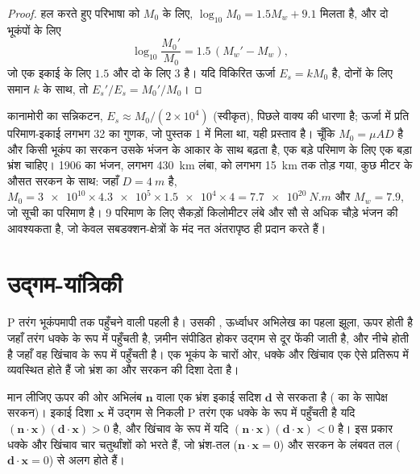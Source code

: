 \begin{proof}
हल करते हुए परिभाषा को $M_0$ के लिए, $\log_{10} M_0 = 1.5 M_w + 9.1$ मिलता है, और दो भूकंपों के लिए
\[
  \log_{10}\frac{M_0'}{M_0} = 1.5\,(M_w' - M_w) ,
\]
जो एक इकाई के लिए $1.5$ और दो के लिए $3$ है। यदि विकिरित ऊर्जा $E_s = k M_0$ है, दोनों के लिए समान $k$ के साथ, तो $E_s'/E_s = M_0'/M_0$।
\end{proof}

कानामोरी का सन्निकटन, $E_s \approx M_0/(2\times10^4)$ (स्वीकृत), पिछले वाक्य की धारणा है; ऊर्जा में प्रति परिमाण-इकाई लगभग 32 का गुणक, जो पुस्तक 1 में मिला था, यही प्रस्ताव है। चूँकि $M_0 = \mu A D$ है और किसी भूकंप का सरकन उसके भंजन के आकार के साथ बढ़ता है, एक बड़े परिमाण के लिए एक बड़ा भ्रंश चाहिए। 1906 का भंजन, लगभग \qty{430}{km} लंबा,  को लगभग \qty{15}{km} तक तोड़ गया, कुछ मीटर के औसत सरकन के साथ: जहाँ $D = \qty{4}{m}$ है, $M_0 = \num{3e10}\times\num{4.3e5}\times\num{1.5e4}
\times 4 = \qty{7.7e20}{N.m}$ और $M_w = 7.9$, जो सूची का परिमाण है। 9 परिमाण के लिए सैकड़ों किलोमीटर लंबे और सौ से अधिक चौड़े भंजन की आवश्यकता है, जो केवल सबडक्शन-क्षेत्रों के मंद नत अंतरापृष्ठ ही प्रदान करते हैं।

\section{उद्गम-यांत्रिकी}\label{sec:b1:earthquake-source:focal}

P तरंग भूकंपमापी तक पहुँचने वाली पहली है। उसकी , ऊर्ध्वाधर अभिलेख का पहला झूला, ऊपर होती है जहाँ तरंग धक्के के रूप में पहुँचती है, ज़मीन संपीडित होकर उद्गम से दूर फेंकी जाती है, और नीचे होती है जहाँ वह खिंचाव के रूप में पहुँचती है। एक भूकंप के चारों ओर, धक्के और खिंचाव एक ऐसे प्रतिरूप में व्यवस्थित होते हैं जो भ्रंश का  और सरकन की दिशा देता है।

\begin{proposition}[प्रथम गति का चिह्न]
\label{prop:b1:earthquake-source:first-motion}
मान लीजिए ऊपर की ओर अभिलंब $\mathbf n$ वाला एक भ्रंश इकाई सदिश $\mathbf d$ से सरकता है ( का  के सापेक्ष सरकन)। इकाई दिशा $\mathbf x$ में उद्गम से निकली P तरंग एक धक्के के रूप में पहुँचती है यदि $(\mathbf n\cdot\mathbf x)(\mathbf d\cdot\mathbf x) > 0$ है, और खिंचाव के रूप में यदि $(\mathbf n\cdot\mathbf x)(\mathbf d\cdot\mathbf x) < 0$ है। इस प्रकार धक्के और खिंचाव चार चतुर्थांशों को भरते हैं, जो भ्रंश-तल ($\mathbf n\cdot\mathbf x = 0$) और सरकन के लंबवत तल ($\mathbf d\cdot\mathbf x = 0$) से अलग होते हैं।
\end{proposition}

